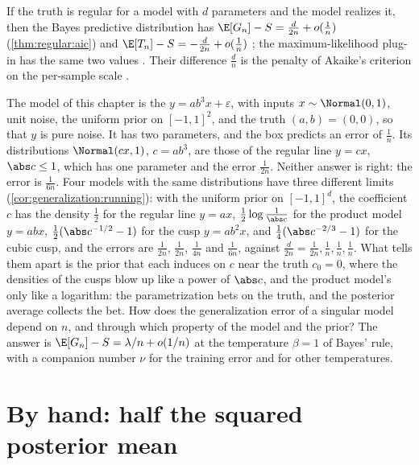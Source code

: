 \begin{refsection}
\begin{regularanswer}
If the truth is regular for a model with $d$ parameters and the model realizes it, then the Bayes predictive distribution has $\E[G_n]-S=\frac d{2n}+o(\frac1n)$ (\cref{thm:regular:aic}) and $\E[T_n]-S=-\frac d{2n}+o(\frac1n)$ \parencite{Watanabe2010a}; the maximum-likelihood plug-in has the same two values \parencite{AmariMurata1993}. Their difference $\frac dn$ is the penalty of Akaike's criterion on the per-sample scale \parencite{Akaike1974}.
\end{regularanswer}

The model of this chapter is the  $y=ab^3x+\varepsilon$, with inputs $x\sim\Normal(0,1)$, unit noise, the uniform prior on $[-1,1]^2$, and the truth $(a,b)=(0,0)$, so that $y$ is pure noise. It has two parameters, and the box predicts an error of $\frac1n$. Its distributions $\Normal(cx,1)$, $c=ab^3$, are those of the regular line $y=cx$, $\abs c\le1$, which has one parameter and the error $\frac1{2n}$. Neither answer is right: the error is $\frac1{6n}$. Four models with the same distributions have three different limits (\cref{cor:generalization:running}): with the uniform prior on $[-1,1]^d$, the coefficient $c$ has the density $\frac12$ for the regular line $y=ax$, $\frac12\log\frac1{\abs c}$ for the product model $y=abx$, $\frac12(\abs c^{-1/2}-1)$ for the cusp $y=ab^2x$, and $\frac14(\abs c^{-2/3}-1)$ for the cubic cusp, and the errors are $\frac1{2n}$, $\frac1{2n}$, $\frac1{4n}$ and $\frac1{6n}$, against $\frac d{2n}=\frac1{2n},\frac1n,\frac1n,\frac1n$. What tells them apart is the prior that each induces on $c$ near the truth $c_0=0$, where the densities of the cusps blow up like a power of $\abs c$, and the product model's only like a logarithm: the parametrization bets on the truth, and the posterior average collects the bet. How does the generalization error of a singular model depend on $n$, and through which property of the model and the prior? The answer is $\E[G_n]-S=\lambda/n+o(1/n)$ at the temperature $\beta=1$ of Bayes' rule, with a companion number $\nu$ for the training error and for other temperatures.

\section{By hand: half the squared posterior mean}\label{sec:generalization:byhand}


\end{refsection}
